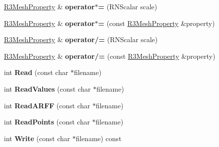\begin{DoxyCompactItemize}
\item 
\hyperlink{struct_r3_mesh_property}{R3\+Mesh\+Property} \& {\bfseries operator$\ast$=} (R\+N\+Scalar scale)\hypertarget{struct_r3_mesh_property_a63e14b949f838c26f81a637abfae9e12}{}\label{struct_r3_mesh_property_a63e14b949f838c26f81a637abfae9e12}

\item 
\hyperlink{struct_r3_mesh_property}{R3\+Mesh\+Property} \& {\bfseries operator$\ast$=} (const \hyperlink{struct_r3_mesh_property}{R3\+Mesh\+Property} \&property)\hypertarget{struct_r3_mesh_property_a34286323c29aa698de2299a4b22492da}{}\label{struct_r3_mesh_property_a34286323c29aa698de2299a4b22492da}

\item 
\hyperlink{struct_r3_mesh_property}{R3\+Mesh\+Property} \& {\bfseries operator/=} (R\+N\+Scalar scale)\hypertarget{struct_r3_mesh_property_a108f252a5f8056c346b3e551471975e4}{}\label{struct_r3_mesh_property_a108f252a5f8056c346b3e551471975e4}

\item 
\hyperlink{struct_r3_mesh_property}{R3\+Mesh\+Property} \& {\bfseries operator/=} (const \hyperlink{struct_r3_mesh_property}{R3\+Mesh\+Property} \&property)\hypertarget{struct_r3_mesh_property_ad0bf5139493727c8452487419887c097}{}\label{struct_r3_mesh_property_ad0bf5139493727c8452487419887c097}

\item 
int {\bfseries Read} (const char $\ast$filename)\hypertarget{struct_r3_mesh_property_abd39f9a55f4e0175a1376709e01c1ba1}{}\label{struct_r3_mesh_property_abd39f9a55f4e0175a1376709e01c1ba1}

\item 
int {\bfseries Read\+Values} (const char $\ast$filename)\hypertarget{struct_r3_mesh_property_aa8be20ecb28f0245cf198aa1051270f9}{}\label{struct_r3_mesh_property_aa8be20ecb28f0245cf198aa1051270f9}

\item 
int {\bfseries Read\+A\+R\+FF} (const char $\ast$filename)\hypertarget{struct_r3_mesh_property_afd70a4d7fb74796659186aa61e095742}{}\label{struct_r3_mesh_property_afd70a4d7fb74796659186aa61e095742}

\item 
int {\bfseries Read\+Points} (const char $\ast$filename)\hypertarget{struct_r3_mesh_property_a160d44d01eea537cdc38a41ee9eef88d}{}\label{struct_r3_mesh_property_a160d44d01eea537cdc38a41ee9eef88d}

\item 
int {\bfseries Write} (const char $\ast$filename) const \hypertarget{struct_r3_mesh_property_a8a3d0150df8489248b204de0c3b45e86}{}\label{struct_r3_mesh_property_a8a3d0150df8489248b204de0c3b45e86}


\end{DoxyCompactItemize}
